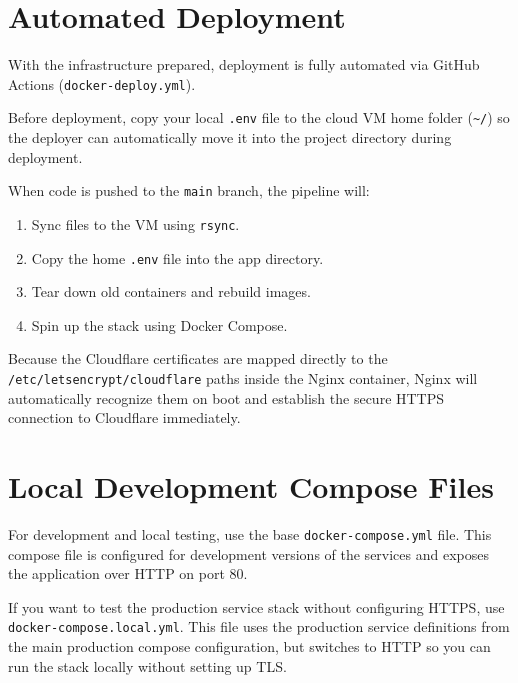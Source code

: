 \documentclass[12pt,a4paper]{article}
\begin{document}
\section{Automated Deployment}
With the infrastructure prepared, deployment is fully automated via GitHub Actions (\texttt{docker-deploy.yml}).

Before deployment, copy your local \texttt{.env} file to the cloud VM home folder (\texttt{\textasciitilde/}) so the deployer can automatically move it into the project directory during deployment.

When code is pushed to the \texttt{main} branch, the pipeline will:
\begin{enumerate}
    \item Sync files to the VM using \texttt{rsync}.
    \item Copy the home \texttt{.env} file into the app directory.
    \item Tear down old containers and rebuild images.
    \item Spin up the stack using Docker Compose.
\end{enumerate}

Because the Cloudflare certificates are mapped directly to the \texttt{/etc/letsencrypt/cloudflare} paths inside the Nginx container, Nginx will automatically recognize them on boot and establish the secure HTTPS connection to Cloudflare immediately.

\section{Local Development Compose Files}
For development and local testing, use the base \texttt{docker-compose.yml} file. This compose file is configured for development versions of the services and exposes the application over HTTP on port 80.

If you want to test the production service stack without configuring HTTPS, use \texttt{docker-compose.local.yml}. This file uses the production service definitions from the main production compose configuration, but switches to HTTP so you can run the stack locally without setting up TLS.
\end{document}
